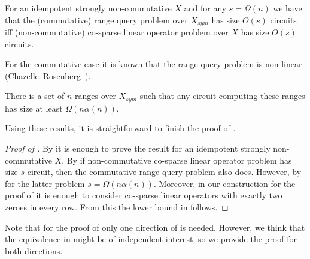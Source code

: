 \documentclass{toc}
\begin{document}
\begin{theorem}\label{thm:equivalence}
For an idempotent strongly non-commutative $X$ and for any $s=\Omega(n)$ we have
that the (commutative)
range query problem
over $X_{sym}$ has size $O(s)$ circuits
iff (non-commutative)
co-sparse
linear operator problem over $X$ has size $O(s)$
circuits.
\end{theorem}

%
For the commutative case it is known that
the range query
problem is non-linear
(Chazelle--Rosenberg~\cite{DBLP:journals/ijcga/ChazelleR91}).  %
\begin{theorem}\label{thm:chazelle}
	There is a set of $n$ ranges over $X_{sym}$ such that any circuit
	computing these ranges has size at least $\Omega(n \alpha(n))$.
\end{theorem}

Using these results, it is straightforward to finish the proof of
.

\begin{proof}[Proof of {}]

By  it is enough to prove the result for an idempotent strongly non-commutative $X$.
By  if non-commutative
co-sparse
linear
operator problem has size $s$ circuit, then the commutative
range query
problem also does. However, by  for the latter problem $s=\Omega(n \alpha(n))$.
Moreover, in our construction for the proof of  it
is enough to consider
co-sparse
linear operators with exactly two zeroes in every
row. From this the lower bound in  follows.
\end{proof}

Note that for the proof of  only one direction of
 is needed. However, we think that the equivalence
in  might be of independent interest, so we provide
the proof for both directions.
\end{document}
